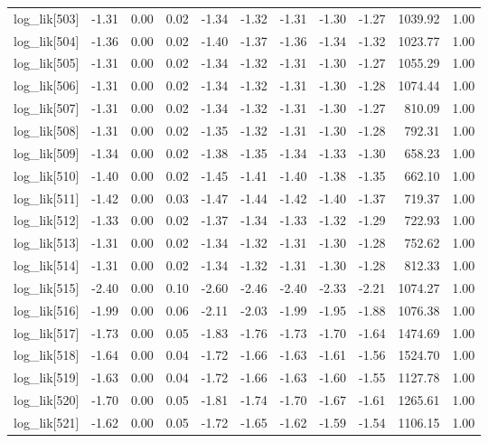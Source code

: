 \begin{table}[ht]
\begin{tabular}{rrrrrrrrrrr}
  log\_lik[503] & -1.31 & 0.00 & 0.02 & -1.34 & -1.32 & -1.31 & -1.30 & -1.27 & 1039.92 & 1.00 \\ 
  log\_lik[504] & -1.36 & 0.00 & 0.02 & -1.40 & -1.37 & -1.36 & -1.34 & -1.32 & 1023.77 & 1.00 \\ 
  log\_lik[505] & -1.31 & 0.00 & 0.02 & -1.34 & -1.32 & -1.31 & -1.30 & -1.27 & 1055.29 & 1.00 \\ 
  log\_lik[506] & -1.31 & 0.00 & 0.02 & -1.34 & -1.32 & -1.31 & -1.30 & -1.28 & 1074.44 & 1.00 \\ 
  log\_lik[507] & -1.31 & 0.00 & 0.02 & -1.34 & -1.32 & -1.31 & -1.30 & -1.27 & 810.09 & 1.00 \\ 
  log\_lik[508] & -1.31 & 0.00 & 0.02 & -1.35 & -1.32 & -1.31 & -1.30 & -1.28 & 792.31 & 1.00 \\ 
  log\_lik[509] & -1.34 & 0.00 & 0.02 & -1.38 & -1.35 & -1.34 & -1.33 & -1.30 & 658.23 & 1.00 \\ 
  log\_lik[510] & -1.40 & 0.00 & 0.02 & -1.45 & -1.41 & -1.40 & -1.38 & -1.35 & 662.10 & 1.00 \\ 
  log\_lik[511] & -1.42 & 0.00 & 0.03 & -1.47 & -1.44 & -1.42 & -1.40 & -1.37 & 719.37 & 1.00 \\ 
  log\_lik[512] & -1.33 & 0.00 & 0.02 & -1.37 & -1.34 & -1.33 & -1.32 & -1.29 & 722.93 & 1.00 \\ 
  log\_lik[513] & -1.31 & 0.00 & 0.02 & -1.34 & -1.32 & -1.31 & -1.30 & -1.28 & 752.62 & 1.00 \\ 
  log\_lik[514] & -1.31 & 0.00 & 0.02 & -1.34 & -1.32 & -1.31 & -1.30 & -1.28 & 812.33 & 1.00 \\ 
  log\_lik[515] & -2.40 & 0.00 & 0.10 & -2.60 & -2.46 & -2.40 & -2.33 & -2.21 & 1074.27 & 1.00 \\ 
  log\_lik[516] & -1.99 & 0.00 & 0.06 & -2.11 & -2.03 & -1.99 & -1.95 & -1.88 & 1076.38 & 1.00 \\ 
  log\_lik[517] & -1.73 & 0.00 & 0.05 & -1.83 & -1.76 & -1.73 & -1.70 & -1.64 & 1474.69 & 1.00 \\ 
  log\_lik[518] & -1.64 & 0.00 & 0.04 & -1.72 & -1.66 & -1.63 & -1.61 & -1.56 & 1524.70 & 1.00 \\ 
  log\_lik[519] & -1.63 & 0.00 & 0.04 & -1.72 & -1.66 & -1.63 & -1.60 & -1.55 & 1127.78 & 1.00 \\ 
  log\_lik[520] & -1.70 & 0.00 & 0.05 & -1.81 & -1.74 & -1.70 & -1.67 & -1.61 & 1265.61 & 1.00 \\ 
  log\_lik[521] & -1.62 & 0.00 & 0.05 & -1.72 & -1.65 & -1.62 & -1.59 & -1.54 & 1106.15 & 1.00 \\ 

\end{tabular}
\end{table}
